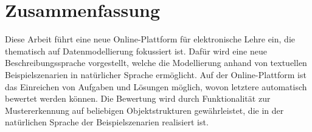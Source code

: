 \chapter*{Zusammenfassung}


Diese Arbeit führt eine neue Online-Plattform für elektronische Lehre ein, die thematisch auf Datenmodellierung fokussiert ist.
Dafür wird eine neue Beschreibungssprache vorgestellt, welche die Modellierung anhand von textuellen Beispielszenarien in natürlicher Sprache ermöglicht.
Auf der Online-Plattform ist das Einreichen von Aufgaben und Lösungen möglich, wovon letztere automatisch bewertet werden können.
Die Bewertung wird durch Funktionalität zur Mustererkennung auf beliebigen Objektstrukturen gewährleistet, die in der natürlichen Sprache der Beispielszenarien realisiert ist.

